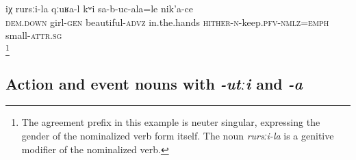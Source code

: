 \begin{exe}
	\ex	\label{(Look at) the way of the girl's holding the child in her hands}
	\gll	iχ	rursːi-la	qːuʁa-l	kʷi	sa-b-uc-ala=le	nik'a-ce\\
		\textsc{dem.down}	girl-\textsc{gen}	beautiful-\textsc{advz}	in.the.hands	\textsc{hither-n}-keep.\textsc{pfv}-\textsc{nmlz}=\textsc{emph}	small-\textsc{attr}.\textsc{sg}\\
	\glt	{}\footnote{The agreement prefix in this example is neuter singular, expressing the gender of the nominalized verb form itself. The noun \textit{rursːi-la} is a genitive modifier of the nominalized verb.}
\end{exe}



\subsection{Action and event nouns with \textit{-utːi} and \textit{-a}}
\label{ssec:Action and event nouns with -uti and -a}

